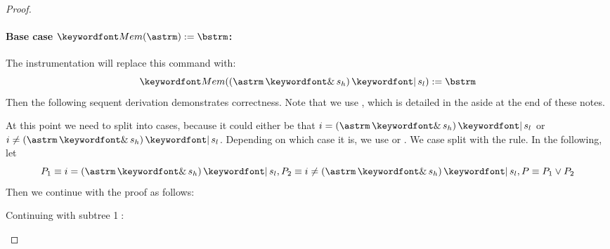 \documentclass[11pt,twoside]{scrartcl}
\begin{document}
\begin{proof}
\paragraph{\textbf{Base case} $\pderef{\astrm}:=\bstrm$:} 
The instrumentation will replace this command with: 
\[
  \pderef{(\astrm \bitand s_h) \bitor s_l}:=\bstrm
\]
Then the following sequent derivation demonstrates correctness. Note that we use , which is detailed in the aside at the end of these notes.
\begin{sequentdeduction}
 {
}
\end{sequentdeduction}
At this point we need to split into cases, because it could either be that $i = (\astrm \bitand s_h) \bitor s_l$ or $i \ne (\astrm \bitand s_h) \bitor s_l$. Depending on which case it is, we use  or . We case split with the  rule. In the following, let
\[
P_1 \equiv i = (\astrm \bitand s_h) \bitor s_l, P_2 \equiv i \ne(\astrm \bitand s_h) \bitor s_l, P \equiv P_1 \lor P_2
\]
Then we continue with the proof as follows:
\begin{sequentdeduction}
 {
}
\end{sequentdeduction}
Continuing with subtree \textcircled{1}:
\begin{sequentdeduction}
\end{sequentdeduction}
\end{proof}
\end{document}
